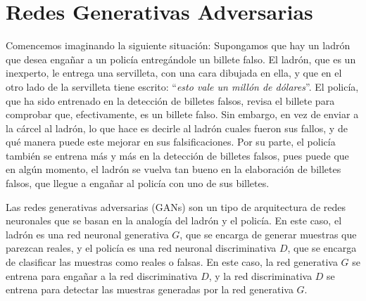 {{        \section{Redes Generativas Adversarias}\label{sec:redes-generativas-adversarias-GAN}
        {
            Comencemos imaginando la siguiente situación: Supongamos que hay un ladrón que desea engañar a un policía entregándole un billete falso. El ladrón, que es un inexperto, le entrega una servilleta, con una cara dibujada en ella, y que en el otro lado de la servilleta tiene escrito: ``\emph{esto vale un millón de dólares}''. El policía, que ha sido entrenado en la detección de billetes falsos, revisa el billete para comprobar que, efectivamente, es un billete falso. Sin embargo, en vez de enviar a la cárcel al ladrón, lo que hace es decirle al ladrón cuales fueron sus fallos, y de qué manera puede este mejorar en sus falsificaciones. Por su parte, el policía también se entrena más y más en la detección de billetes falsos, pues puede que en algún momento, el ladrón se vuelva tan bueno en la elaboración de billetes falsos, que llegue a engañar al policía con uno de sus billetes.

            Las redes generativas adversarias (GANs) son un tipo de arquitectura de redes neuronales que se basan en la analogía del ladrón y el policía. En este caso, el ladrón es una red neuronal generativa $G$, que se encarga de generar muestras que parezcan reales, y el policía es una red neuronal discriminativa $D$, que se encarga de clasificar las muestras como reales o falsas. En este caso, la red generativa $G$ se entrena para engañar a la red discriminativa $D$, y la red discriminativa $D$ se entrena para detectar las muestras generadas por la red generativa $G$.


        }  %



    }  %
}  %